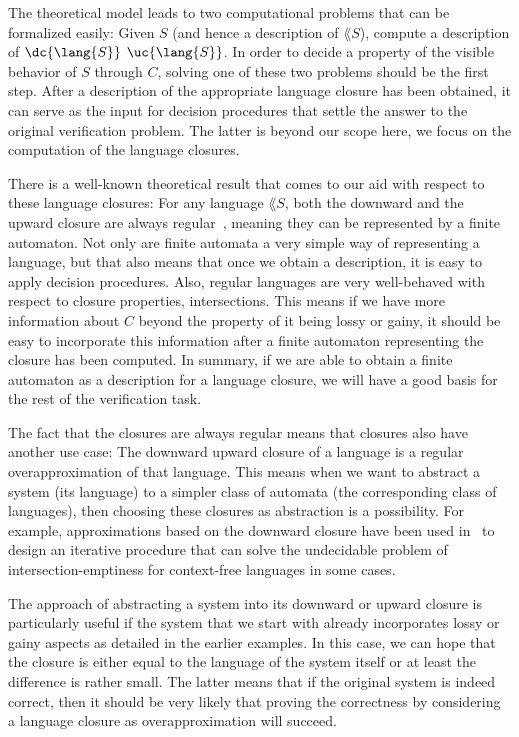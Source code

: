 \documentclass[../../diss.tex]{subfiles}
\begin{document}
The theoretical model leads to two computational problems that can be formalized easily:
Given $S$ (and hence a description of $\lang{S}$), compute a description of $\dc{\lang{S}}$ \resp $\uc{\lang{S}}$.
In order to decide a property of the visible behavior of $S$ through $C$, solving one of these two problems should be the first step.
After a description of the appropriate language closure has been obtained, it can serve as the input for decision procedures that settle the answer to the original verification problem.
The latter is beyond our scope here, we focus on the computation of the language closures.

There is a well-known theoretical result that comes to our aid with respect to these language closures:
For any language $\lang{S}$, both the downward and the upward closure are always regular~\cite{Haines69}, meaning they can be represented by a finite automaton.
Not only are finite automata a very simple way of representing a language, but that also means that once we obtain a description, it is easy to apply decision procedures.
Also, regular languages are very well-behaved with respect to closure properties, \eg intersections.
This means if we have more information about $C$ beyond the property of it being lossy or gainy, it should be easy to incorporate this information after a finite automaton representing the closure has been computed.
In summary, if we are able to obtain a finite automaton as a description for a language closure, we will have a good basis for the rest of the verification task.

The fact that the closures are always regular means that closures also have another use case:
The downward \resp upward closure of a language is a regular overapproximation of that language.
This means when we want to abstract a system (\resp its language) to a simpler class of automata (\resp the corresponding class of languages), then choosing these closures as abstraction is a possibility.
For example, approximations based on the downward closure have been used in~\cite{LongCMM12} to design an iterative procedure that can solve the undecidable problem of intersection-emptiness for context-free languages in some cases.

The approach of abstracting a system into its downward or upward closure is particularly useful if the system that we start with already incorporates lossy or gainy aspects as detailed in the earlier examples.
In this case, we can hope that the closure is either equal to the language of the system itself or at least the difference is rather small.
The latter means that if the original system is indeed correct, then it should be very likely that proving the correctness by considering a language closure as overapproximation will succeed.
\end{document}
